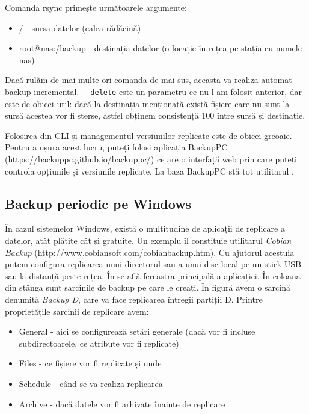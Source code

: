 Comanda rsync primește următoarele argumente:

\begin{itemize}
	\item / - sursa datelor (calea rădăcină)
	\item root@nas:/backup - destinația datelor (o locație în rețea pe
		stația cu numele nas)
\end{itemize}


Dacă rulăm de mai multe ori comanda de mai sus, aceasta va realiza automat
backup incremental. \texttt{-{}-delete} este un parametru ce nu l-am folosit
anterior, dar este de obicei util: dacă la destinația menționată există fișiere
care nu sunt la sursă acestea vor fi șterse, astfel obținem consistență 100%
între sursă și destinație.


Folosirea  din CLI și managementul versiunilor replicate este de obicei
greoaie. Pentru a ușura acest lucru, puteți folosi aplicația BackupPC
(https://backuppc.github.io/backuppc/) ce are o interfață web prin care puteți
controla opțiunile și versiunile replicate. La baza BackupPC stă tot utilitarul
.

\subsection{Backup periodic pe Windows}
\label{sec:storage-backup-windows}

În cazul sistemelor Windows, există o multitudine de aplicații de replicare a
datelor, atât plătite cât și gratuite. Un exemplu îl constituie utilitarul
\textit{Cobian Backup} (http://www.cobiansoft.com/cobianbackup.htm). Cu ajutorul
acestuia putem configura replicarea unui directorul sau a unui disc local pe un
stick USB sau la distanță peste rețea. În
 se află fereastra principală a
aplicației. În coloana din stânga sunt sarcinile de backup pe care le creați. În
figură avem o sarcină denumită \textit{Backup D}, care va face replicarea
întregii partiții D. Printre proprietățile sarcinii de replicare avem:

\begin{itemize}
	\item General - aici se configurează setări generale (dacă vor fi
		incluse subdirectoarele, ce atribute vor fi replicate)
	\item Files - ce fișiere vor fi replicate și unde
	\item Schedule - când se va realiza replicarea
	\item Archive - dacă datele vor fi arhivate înainte de replicare
\end{itemize}

